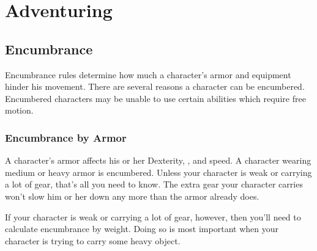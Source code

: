 \chapter{Adventuring}

\section{Encumbrance}\label{Encumbrance}
Encumbrance rules determine how much a character's armor and equipment hinder his movement. There are several reasons a character can be encumbered. Encumbered characters may be unable to use certain abilities which require free motion.

\subsection{Encumbrance by Armor}

A character's armor affects his or her Dexterity, , and speed. A character wearing medium or heavy armor is encumbered. Unless your character is weak or carrying a lot of gear, that's all you need to know. The extra gear your character carries won't slow him or her down any more than the armor already does.

If your character is weak or carrying a lot of gear, however, then you'll need to calculate encumbrance by weight. Doing so is most important when your character is trying to carry some heavy object.

